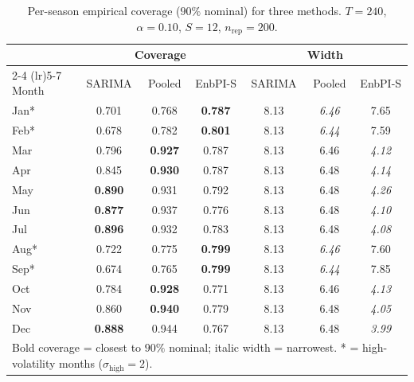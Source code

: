 \begin{table}[ht]
\centering
\caption{Per-season empirical coverage ($90\%$ nominal) for three methods.
$T=240$, $\alpha=0.10$, $S=12$, $n_{\mathrm{rep}}=200$.}
\label{tab:e1_three_methods_T240}
\begin{tabular}{l ccc ccc}
\toprule
 & \multicolumn{3}{c}{Coverage} & \multicolumn{3}{c}{Width} \\
\cmidrule(lr){2-4} \cmidrule(lr){5-7}
Month & SARIMA & Pooled & EnbPI-S & SARIMA & Pooled & EnbPI-S \\
\midrule
Jan* & 0.701 & 0.768 & \textbf{0.787} & 8.13 & \textit{6.46} & 7.65 \\
Feb* & 0.678 & 0.782 & \textbf{0.801} & 8.13 & \textit{6.44} & 7.59 \\
Mar & 0.796 & \textbf{0.927} & 0.787 & 8.13 & 6.46 & \textit{4.12} \\
Apr & 0.845 & \textbf{0.930} & 0.787 & 8.13 & 6.48 & \textit{4.14} \\
May & \textbf{0.890} & 0.931 & 0.792 & 8.13 & 6.48 & \textit{4.26} \\
Jun & \textbf{0.877} & 0.937 & 0.776 & 8.13 & 6.48 & \textit{4.10} \\
Jul & \textbf{0.896} & 0.932 & 0.783 & 8.13 & 6.48 & \textit{4.08} \\
Aug* & 0.722 & 0.775 & \textbf{0.799} & 8.13 & \textit{6.46} & 7.60 \\
Sep* & 0.674 & 0.765 & \textbf{0.799} & 8.13 & \textit{6.44} & 7.85 \\
Oct & 0.784 & \textbf{0.928} & 0.771 & 8.13 & 6.46 & \textit{4.13} \\
Nov & 0.860 & \textbf{0.940} & 0.779 & 8.13 & 6.48 & \textit{4.05} \\
Dec & \textbf{0.888} & 0.944 & 0.767 & 8.13 & 6.48 & \textit{3.99} \\
\bottomrule
\multicolumn{7}{l}{\footnotesize Bold coverage = closest to $90\%$ nominal; italic width = narrowest.  * = high-volatility months ($\sigma_{\mathrm{high}}=2$).} \\
\end{tabular}
\end{table}